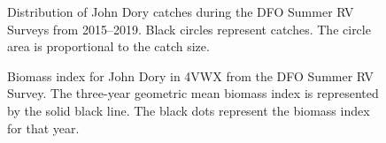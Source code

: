 \documentclass[11pt]{book}
\begin{document}
\begin{figure}[htb]

{\centering {} 

}

\caption{Distribution of John Dory catches during the DFO Summer RV Surveys from 2015--2019. Black circles represent catches. The circle area is proportional to the catch size.}\label{fig:126-map-johndory}
\end{figure}

\begin{figure}[htb]

{\centering {} 

}

\caption{Biomass index for John Dory in 4VWX from the DFO Summer RV Survey. The three-year geometric mean biomass index is represented by the solid black line. The black dots represent the biomass index for that year.}\label{fig:127-fig-johndory-biomass}
\end{figure}
\clearpage
\end{document}
